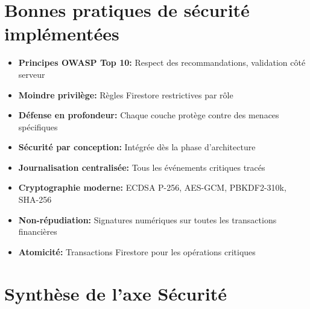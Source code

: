 \documentclass[12pt,a4paper]{report}
\begin{document}
\vspace{0.2cm}
\section{Bonnes pratiques de sécurité implémentées}

\begin{tcolorbox}[
    infobox,
    title={Bonnes pratiques de sécurité},
    boxsep=2pt,
    left=2pt,right=2pt,top=2pt,bottom=2pt
  ]

  {\scriptsize %

    \begin{itemize}[itemsep=1pt, topsep=2pt, parsep=0pt]
      \item \textbf{Principes OWASP Top 10:} Respect des recommandations, validation côté serveur
      \item \textbf{Moindre privilège:} Règles Firestore restrictives par rôle
      \item \textbf{Défense en profondeur:} Chaque couche protège contre des menaces spécifiques
      \item \textbf{Sécurité par conception:} Intégrée dès la phase d'architecture
      \item \textbf{Journalisation centralisée:} Tous les événements critiques tracés
      \item \textbf{Cryptographie moderne:} ECDSA P-256, AES-GCM, PBKDF2-310k, SHA-256
      \item \textbf{Non-répudiation:} Signatures numériques sur toutes les transactions financières
      \item \textbf{Atomicité:} Transactions Firestore pour les opérations critiques
    \end{itemize}

  }

\end{tcolorbox}
\vspace{0.5cm}

\section{Synthèse de l'axe Sécurité}
\end{document}
